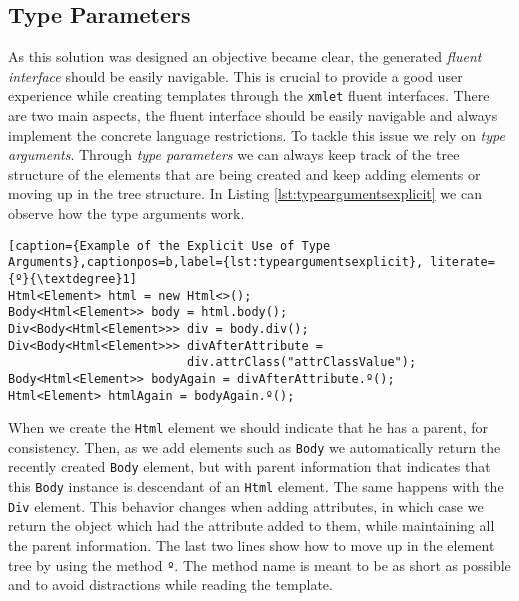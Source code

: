 \subsection{Type Parameters}
\label{sec:typeparameters}

As this solution was designed an objective became clear, the generated \textit{fluent interface} should be easily navigable. This is crucial to provide a good user experience while creating templates through the \texttt{xmlet} fluent interfaces. There are two main aspects, the fluent interface should be easily navigable and always implement the concrete language restrictions. To tackle this issue we rely on \textit{type arguments}. Through \textit{type parameters} we can always keep track of the tree structure of the elements that are being created and keep adding elements or moving up in the tree structure. In Listing \ref{lst:typeargumentsexplicit} we can observe how the type arguments work. 

\bigskip


\begin{minipage}{\linewidth}
\begin{lstlisting}[caption={Example of the Explicit Use of Type Arguments},captionpos=b,label={lst:typeargumentsexplicit}, literate={º}{\textdegree}1]
Html<Element> html = new Html<>();
Body<Html<Element>> body = html.body();
Div<Body<Html<Element>>> div = body.div();
Div<Body<Html<Element>>> divAfterAttribute = 
                         div.attrClass("attrClassValue");
Body<Html<Element>> bodyAgain = divAfterAttribute.º();
Html<Element> htmlAgain = bodyAgain.º();
\end{lstlisting}
\end{minipage}

\noindent
When we create the \texttt{Html} element we should indicate that he has a parent, for consistency. Then, as we add elements such as \texttt{Body} we automatically return the recently created \texttt{Body} element, but with parent information that indicates that this \texttt{Body} instance is descendant of an \texttt{Html} element. The same happens with the \texttt{Div} element. This behavior changes when adding attributes, in which case we return the object which had the attribute added to them, while maintaining all the parent information. The last two lines show how to move up in the element tree by using the method \texttt{º}. The method name is meant to be as short as possible and to avoid distractions while reading the template. 

